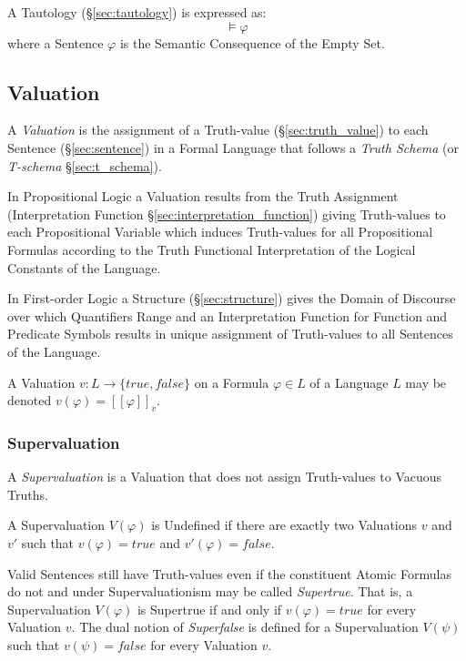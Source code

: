 A Tautology (\S\ref{sec:tautology}) is expressed as:
\[
    \vDash {\varphi}
\]
where a Sentence $\varphi$ is the Semantic Consequence of the Empty
Set.



\subsection{Valuation}\label{sec:valuation}

A \emph{Valuation} is the assignment of a Truth-value
(\S\ref{sec:truth_value}) to each Sentence (\S\ref{sec:sentence}) in a
Formal Language that follows a \emph{Truth Schema} (or \emph{T-schema}
\S\ref{sec:t_schema}).

In Propositional Logic a Valuation results from the Truth Assignment
(Interpretation Function \S\ref{sec:interpretation_function}) giving
Truth-values to each Propositional Variable which induces Truth-values
for all Propositional Formulas according to the Truth Functional
Interpretation of the Logical Constants of the Language.

In First-order Logic a Structure (\S\ref{sec:structure}) gives the
Domain of Discourse over which Quantifiers Range and an Interpretation
Function for Function and Predicate Symbols results in unique
assignment of Truth-values to all Sentences of the Language.

A Valuation $v : L \rightarrow \{true, false\}$ on a Formula $\varphi
\in L$ of a Language $L$ may be denoted $v(\varphi) = [[\varphi]]_v$.



\subsubsection{Supervaluation}\label{sec:supervaluation}

A \emph{Supervaluation} is a Valuation that does not assign
Truth-values to Vacuous Truths.

A Supervaluation $V(\varphi)$ is Undefined if there are exactly two
Valuations $v$ and $v'$ such that $v(\varphi) = true$ and $v'(\varphi)
= false$.

Valid Sentences still have Truth-values even if the constituent Atomic
Formulas do not and under Supervaluationism may be called
\emph{Supertrue}. That is, a Supervaluation $V(\varphi)$ is Supertrue
if and only if $v(\varphi) = true$ for every Valuation $v$. The dual
notion of \emph{Superfalse} is defined for a Supervaluation $V(\psi)$
such that $v(\psi) = false$ for every Valuation $v$.



